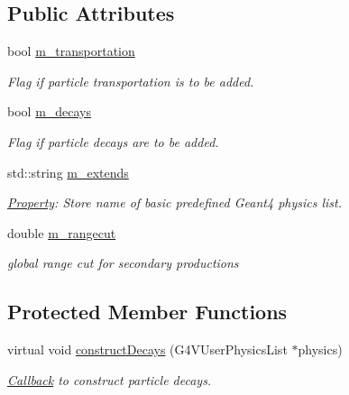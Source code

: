 \subsection*{Public Attributes}
\begin{DoxyCompactItemize}
\item 
bool \hyperlink{class_d_d4hep_1_1_simulation_1_1_geant4_physics_list_action_sequence_aa8940ea98233de519fa743f4cbf02381}{m\+\_\+transportation}
\begin{DoxyCompactList}\small\item\em Flag if particle transportation is to be added. \end{DoxyCompactList}\item 
bool \hyperlink{class_d_d4hep_1_1_simulation_1_1_geant4_physics_list_action_sequence_a92b7972cbc8ee15f7213d68609121b4e}{m\+\_\+decays}
\begin{DoxyCompactList}\small\item\em Flag if particle decays are to be added. \end{DoxyCompactList}\item 
std\+::string \hyperlink{class_d_d4hep_1_1_simulation_1_1_geant4_physics_list_action_sequence_a0231a66223374c98dd4d0763893e8cad}{m\+\_\+extends}
\begin{DoxyCompactList}\small\item\em \hyperlink{class_d_d4hep_1_1_property}{Property}\+: Store name of basic predefined Geant4 physics list. \end{DoxyCompactList}\item 
double \hyperlink{class_d_d4hep_1_1_simulation_1_1_geant4_physics_list_action_sequence_a125a5acaa8915ef45d5832351ce3a9df}{m\+\_\+rangecut}
\begin{DoxyCompactList}\small\item\em global range cut for secondary productions \end{DoxyCompactList}\end{DoxyCompactItemize}
\subsection*{Protected Member Functions}
\begin{DoxyCompactItemize}
\item 
virtual void \hyperlink{class_d_d4hep_1_1_simulation_1_1_geant4_physics_list_action_sequence_ad87f044fc81f3ac371ad5396dcb21d53}{construct\+Decays} (G4\+V\+User\+Physics\+List $\ast$physics)
\begin{DoxyCompactList}\small\item\em \hyperlink{class_d_d4hep_1_1_callback}{Callback} to construct particle decays. \end{DoxyCompactList}\end{DoxyCompactItemize}

